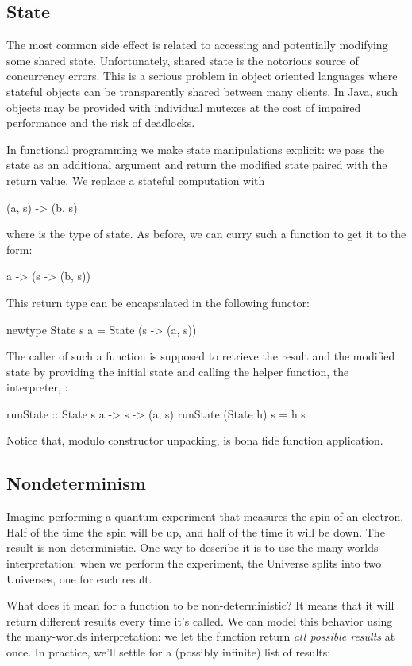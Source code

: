 \documentclass[DaoFP]{subfiles}
\begin{document}
\subsection{State}

The most common side effect is related to accessing and potentially modifying some shared state. Unfortunately, shared state is the notorious source of concurrency errors. This is a serious problem in object oriented languages where stateful objects can be transparently shared between many clients. In Java, such objects may be provided with individual mutexes at the cost of impaired performance and the risk of deadlocks.

In functional programming we make state manipulations explicit: we pass the state as an additional argument and return the modified state paired with the return value. We replace a stateful computation  with
\begin{haskell}
(a, s) -> (b, s)
\end{haskell}
where  is the type of state. As before, we can curry such a function to get it to the form:
\begin{haskell}
a -> (s -> (b, s))
\end{haskell}
This return type can be encapsulated in the following functor:
\begin{haskell}
newtype State s a = State (s -> (a, s))
\end{haskell}
The caller of such a function is supposed to retrieve the result and the modified state by providing the initial state and calling the helper function, the interpreter, :
\begin{haskell}
runState :: State s a -> s -> (a, s)
runState (State h) s = h s
\end{haskell}
Notice that, modulo constructor unpacking,  is bona fide function application. 

\subsection{Nondeterminism}

Imagine performing a quantum experiment that measures the spin of an electron. Half of the time the spin will be up, and half of the time it will be down. The result is non-deterministic. One way to describe it is to use the many-worlds interpretation: when we perform the experiment, the Universe splits into two Universes, one for each result.  

What does it mean for a function to be non-deterministic? It means that it will return different results every time it's called. We can model this behavior using the many-worlds interpretation: we let the function return \emph{all possible results} at once. In practice, we'll settle for a (possibly infinite) list of results:
\end{document}
